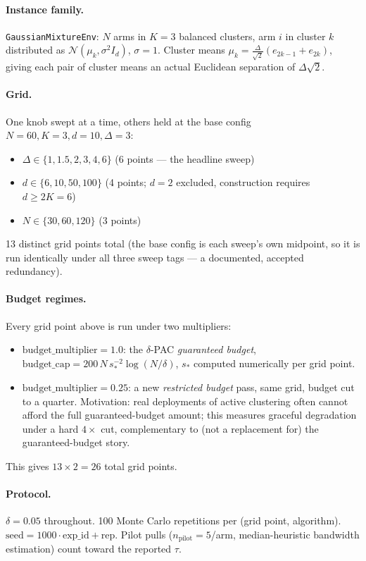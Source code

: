\documentclass[11pt]{article}
\begin{document}
\paragraph{Instance family.} \texttt{GaussianMixtureEnv}: $N$ arms in $K=3$ balanced
clusters, arm $i$ in cluster $k$ distributed as $\mathcal{N}(\mu_k, \sigma^2 I_d)$,
$\sigma=1$. Cluster means $\mu_k = \frac{\Delta}{\sqrt2}(e_{2k-1}+e_{2k})$, giving each
pair of cluster means an actual Euclidean separation of $\Delta\sqrt2$.

\paragraph{Grid.} One knob swept at a time, others held at the base config
$N{=}60, K{=}3, d{=}10, \Delta{=}3$:
\begin{itemize}
  \item $\Delta \in \{1, 1.5, 2, 3, 4, 6\}$ (6 points --- the headline sweep)
  \item $d \in \{6, 10, 50, 100\}$ (4 points; $d=2$ excluded, construction requires $d \ge 2K=6$)
  \item $N \in \{30, 60, 120\}$ (3 points)
\end{itemize}
13 distinct grid points total (the base config is each sweep's own midpoint, so it
is run identically under all three sweep tags --- a documented, accepted
redundancy).

\paragraph{Budget regimes.} Every grid point above is run under two multipliers:
\begin{itemize}
  \item $\text{budget\_multiplier}=1.0$: the $\delta$-PAC \emph{guaranteed budget},
    $\text{budget\_cap} = 200\, N\, s_*^{-2}\log(N/\delta)$, $s_*$ computed numerically
    per grid point.
  \item $\text{budget\_multiplier}=0.25$: a new \emph{restricted budget} pass, same
    grid, budget cut to a quarter. Motivation: real deployments of active
    clustering often cannot afford the full guaranteed-budget amount; this
    measures graceful degradation under a hard $4\times$ cut, complementary to
    (not a replacement for) the guaranteed-budget story.
\end{itemize}
This gives $13 \times 2 = 26$ total grid points.

\paragraph{Protocol.} $\delta=0.05$ throughout. 100 Monte Carlo repetitions per
(grid point, algorithm). $\text{seed} = 1000 \cdot \text{exp\_id} + \text{rep}$. Pilot
pulls ($n_{\text{pilot}}=5$/arm, median-heuristic bandwidth estimation) count toward
the reported $\tau$.
\end{document}
